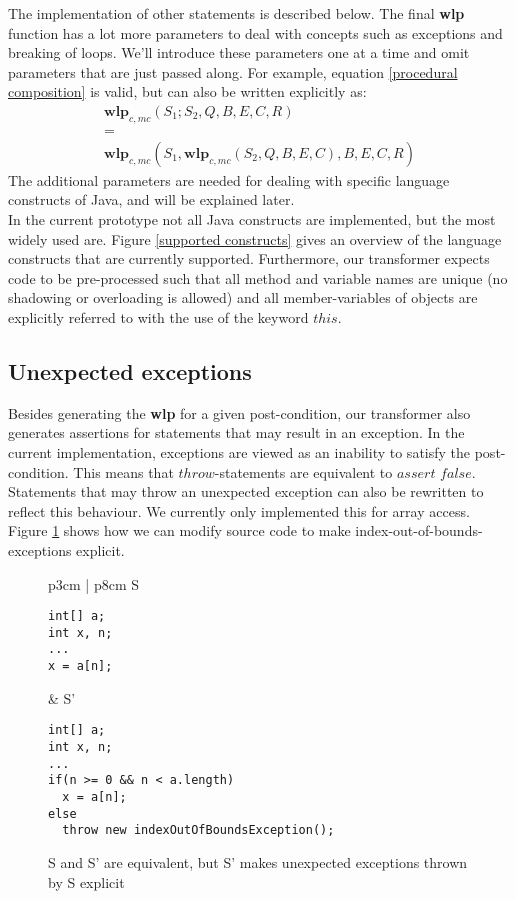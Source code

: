\documentclass[a4paper, fleqn]{article}
\newcommand{\wlp}{\textbf{wlp}\xspace}
\begin{document}
The implementation of other statements is described below. The final \wlp function has a lot more parameters to deal with concepts such as exceptions and breaking of loops. We'll introduce these parameters one at a time and omit parameters that are just passed along. For example, equation \ref{procedural composition} is valid, but can also be written explicitly as: \[\begin{array}{c}
\wlp_{c, mc}(S_1;S_2, Q, B, E, C, R)\\ 
=\\
\wlp_{c, mc}(S_1,\wlp_{c, mc}(S_2, Q, B, E, C), B, E, C, R) \end{array}\] 
The additional parameters are needed for dealing with specific language constructs of Java, and will be explained later.
\\
In the current prototype not all Java constructs are implemented, but the most widely used are. Figure \ref{supported constructs} gives an overview of the language constructs that are currently supported. Furthermore, our transformer expects code to be pre-processed such that all method and variable names are unique (no shadowing or overloading is allowed) and all member-variables of objects are explicitly referred to with the use of the keyword $this$.


\subsection{Unexpected exceptions}
Besides generating the \wlp for a given post-condition, our transformer also generates assertions for statements that may result in an exception. In the current implementation, exceptions are viewed as an inability to satisfy the post-condition. This means that $throw$-statements are equivalent to $assert$ $false$. Statements that may throw an unexpected exception can also be rewritten to reflect this behaviour. We currently only implemented this for array access. Figure \ref{explicit exceptions} shows how we can modify source code to make index-out-of-bounds-exceptions explicit.
\\
\begin{figure}[H]
\begin{tabular}{ p{3cm} | p{8cm}}
S
\begin{lstlisting}
int[] a;
int x, n;
...
x = a[n];
\end{lstlisting}
&
S'
\begin{lstlisting}
int[] a;
int x, n;
...
if(n >= 0 && n < a.length)
  x = a[n];
else
  throw new indexOutOfBoundsException();
\end{lstlisting}
\end{tabular}\caption{S and S' are equivalent, but S' makes unexpected exceptions thrown by S explicit}
\label{explicit exceptions}
\end{figure}
\end{document}
